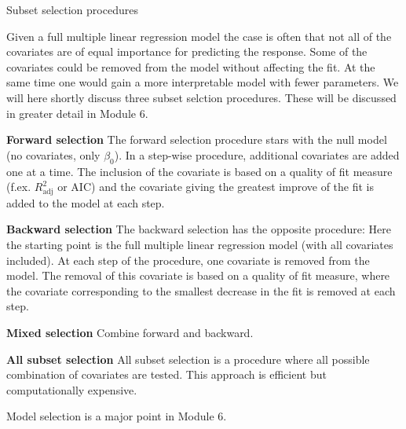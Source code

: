 \documentclass[10pt,ignorenonframetext,]{beamer}
\begin{document}
\begin{frame}

\begin{block}{Subset selection procedures}

Given a full multiple linear regression model the case is often that not
all of the covariates are of equal importance for predicting the
response. Some of the covariates could be removed from the model without
affecting the fit. At the same time one would gain a more interpretable
model with fewer parameters. We will here shortly discuss three subset
selction procedures. These will be discussed in greater detail in Module
6.

\textbf{Forward selection} The forward selection procedure stars with
the null model (no covariates, only \(\beta_0\)). In a step-wise
procedure, additional covariates are added one at a time. The inclusion
of the covariate is based on a quality of fit measure (f.ex.
\(R^2_{\text{adj}}\) or AIC) and the covariate giving the greatest
improve of the fit is added to the model at each step.

\end{block}

\end{frame}

\begin{frame}

\textbf{Backward selection} The backward selection has the opposite
procedure: Here the starting point is the full multiple linear
regression model (with all covariates included). At each step of the
procedure, one covariate is removed from the model. The removal of this
covariate is based on a quality of fit measure, where the covariate
corresponding to the smallest decrease in the fit is removed at each
step.

\textbf{Mixed selection} Combine forward and backward.

\textbf{All subset selection} All subset selection is a procedure where
all possible combination of covariates are tested. This approach is
efficient but computationally expensive.

Model selection is a major point in Module 6.

\end{frame}
\end{document}
